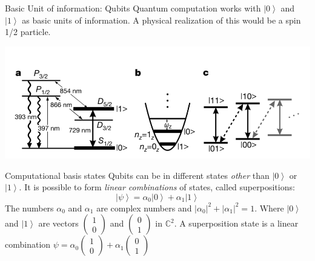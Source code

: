 \documentclass{beamer}
\newcommand{\ket}[1]{\left| #1 \right>} %
\begin{document}
\begin{frame}{Basic Unit of information: Qubits}
	\justifying
	Quantum computation works with $\ket{0}$ and $\ket{1}$ as basic units of information. A physical realization of this would be a spin 1/2 particle.
		
	\center
	\includegraphics[keepaspectratio=true,width=.8\paperwidth]{.attachments/Qubit.png}
\end{frame}


\begin{frame}{Computational basis states}
	\justifying
	Qubits can be in different states \textit{other} than $\ket{0}$ or $\ket{1}$. It is possible to form \textit{linear combinations} of states, called superpositions:
	$$\ket{\psi}= \alpha_0 \ket{0} + \alpha_1 \ket{1}$$
	The numbers $\alpha_0$ and $\alpha_1$ are complex numbers and ${|\alpha_0|}^2+|\alpha_1|^2=1$. 
	\newline
	\newline
	Where $\ket{0}$ and $\ket{1}$ are vectors $\begin{pmatrix} 1 \\ 0 \end{pmatrix}$ and $\begin{pmatrix} 0 \\1 \end{pmatrix}$ in ${\mathbb{C}}^2$.
	\newline
	\newline
	A superposition state is a linear combination $ \psi =\alpha_0 \begin{pmatrix} 1 \\ 0 \end{pmatrix} + \alpha_1 \begin{pmatrix} 0 \\ 1 \end{pmatrix}$
\end{frame}
\end{document}
